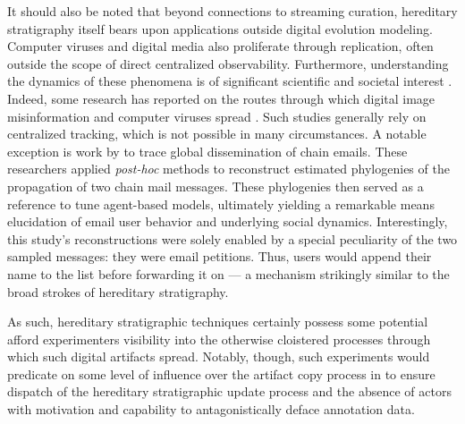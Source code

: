 It should also be noted that beyond connections to streaming curation, hereditary stratigraphy itself bears upon applications outside digital evolution modeling.
Computer viruses and digital media also proliferate through replication, often outside the scope of direct centralized observability.
Furthermore, understanding the dynamics of these phenomena is of significant scientific and societal interest \citep{aslan2020comprehensive,dupuis2019spread,ling2021dissecting}.
Indeed, some research has reported on the routes through which digital image misinformation and computer viruses spread \citep{friggeri2014rumor,cohen1987computer}.
Such studies generally rely on centralized tracking, which is not possible in many circumstances.
A notable exception is work by \cite{libennowell2008tracing} to trace global dissemination of chain emails.
These researchers applied \textit{post-hoc} methods to reconstruct estimated phylogenies of the propagation of two chain mail messages.
These phylogenies then served as a reference to tune agent-based models, ultimately yielding a remarkable means elucidation of email user behavior and underlying social dynamics.
Interestingly, this study's reconstructions were solely enabled by a special peculiarity of the two sampled messages: they were email petitions.
Thus, users would append their name to the list before forwarding it on --- a mechanism strikingly similar to the broad strokes of hereditary stratigraphy.

As such, hereditary stratigraphic techniques certainly possess some potential afford experimenters visibility into the otherwise cloistered processes through which such digital artifacts spread.
Notably, though, such experiments would predicate on some level of influence over the artifact copy process in to ensure dispatch of the hereditary stratigraphic update process and the absence of actors with motivation and capability to antagonistically deface annotation data.

